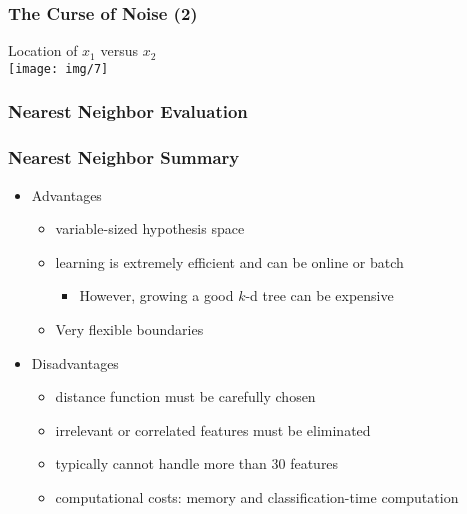 \documentclass{beamer}
\newcommand*{\utb}{\item[{\texttt{[image: img/UTSymbols-Bullet.png]}}]}
\begin{document}
\begin{frame}
    \frametitle{The Curse of Noise (2)}
    \begin{center}
        \Large Location of $x_1$ versus $x_2$ \\
        \texttt{[image: img/7]}
    \end{center}
\end{frame}

\begin{frame}
    \frametitle{Nearest Neighbor Evaluation}
\end{frame}

\begin{frame}
    \frametitle{Nearest Neighbor Summary}
    \begin{itemize}
        \utb Advantages
        \begin{itemize}
            \utb variable-sized hypothesis space
            \utb learning is extremely efficient and can be online or batch
            \begin{itemize}
                \utb However, growing a good $k$-d tree can be expensive
            \end{itemize}
            \utb Very flexible boundaries
        \end{itemize}
        \utb Disadvantages
        \begin{itemize}
            \utb distance function must be carefully chosen
            \utb irrelevant or correlated features must be eliminated
            \utb typically cannot handle more than 30 features
            \utb computational costs: memory and classification-time computation
        \end{itemize}
    \end{itemize}
\end{frame}
\end{document}
